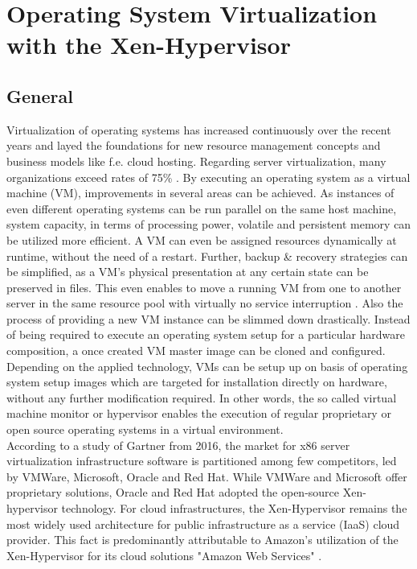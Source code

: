 \chapter{Operating System Virtualization with the Xen-Hypervisor}
\label{cha:2}

\section{General}\label{sec:xen-generall}

Virtualization of operating systems has increased continuously over the recent years and layed the foundations for new resource management concepts and business models like f.e. cloud hosting. Regarding server virtualization, many organizations exceed rates of 75\% \cite{gartnervmmarket}. By executing an operating system as a virtual machine (VM), improvements in several areas can be achieved. As instances of even different operating systems can be run parallel on the same host machine, system capacity, in terms of processing power, volatile and persistent memory can be utilized more efficient. A VM can even be assigned resources dynamically at runtime, without the need of a restart. Further, backup \& recovery strategies can be simplified, as a VM's physical presentation at any certain state can be preserved in files. This even enables to move a running VM from one to another server in the same resource pool with virtually no service interruption \cite{migratevms}. Also the process of providing a new VM instance can be slimmed down drastically. Instead of being required to execute an operating system setup for a particular hardware composition, a once created VM master image can be cloned and configured. Depending on the applied technology, VMs can be setup up on basis of operating system setup images which are targeted for installation directly on hardware, without any further modification required. In other words, the so called virtual machine monitor or hypervisor enables the execution of regular proprietary or open source operating systems in a virtual environment. \\
According to a study of Gartner from 2016, the market for x86 server virtualization infrastructure software is partitioned among few competitors, led by VMWare, Microsoft, Oracle and Red Hat. While VMWare and Microsoft offer proprietary solutions, Oracle and Red Hat adopted the open-source Xen-hypervisor technology. For cloud infrastructures, the Xen-Hypervisor remains the most widely used architecture for public infrastructure as a service (IaaS) cloud provider. This fact is predominantly attributable to Amazon's utilization of the Xen-Hypervisor for its cloud solutions "Amazon Web Services" \cite{bittman2016magic}.
